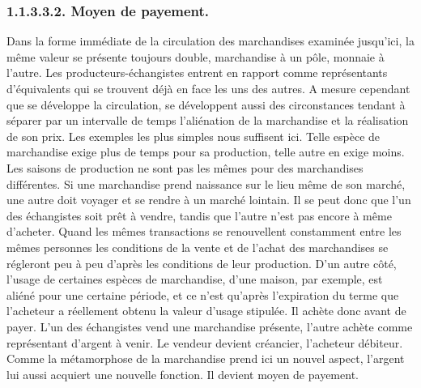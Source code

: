 \documentclass[french,twoside]{book} %
\begin{document}
\subsubsection[{1.1.3.3.2. Moyen de payement.}]{1.1.3.3.2. Moyen de payement.}
\noindent Dans la forme immédiate de la circulation des marchandises examinée jusqu’ici, la même valeur se présente toujours double, marchandise à un pôle, monnaie à l’autre. Les producteurs-échangistes entrent en rapport comme représentants d’équivalents qui se trouvent déjà en face les uns des autres. A mesure cependant que se développe la circulation, se développent aussi des circonstances tendant à séparer par un intervalle de temps l’aliénation de la marchandise et la réalisation de son prix. Les exemples les plus simples nous suffisent ici. Telle espèce de marchandise exige plus de temps pour sa production, telle autre en exige moins. Les saisons de production ne sont pas les mêmes pour des marchandises différentes. Si une marchandise prend naissance sur le lieu même de son marché, une autre doit voyager et se rendre à un marché lointain. Il se peut donc que l’un des échangistes soit prêt à vendre, tandis que l’autre n’est pas encore à même d’acheter. Quand les mêmes transactions se renouvellent constamment entre les mêmes personnes les conditions de la vente et de l’achat des marchandises se régleront peu à peu d’après les conditions de leur production. D’un autre côté, l’usage de certaines espèces de marchandise, d’une maison, par exemple, est aliéné pour une certaine période, et ce n’est qu’après l’expiration du terme que l’acheteur a réellement obtenu la valeur d’usage stipulée. Il achète donc avant de payer. L’un des échangistes vend une marchandise présente, l’autre achète comme représentant d’argent à venir. Le vendeur devient créancier, l’acheteur débiteur. Comme la métamorphose de la marchandise prend ici un nouvel aspect, l’argent lui aussi acquiert une nouvelle fonction. Il devient moyen de payement.\par
\end{document}
